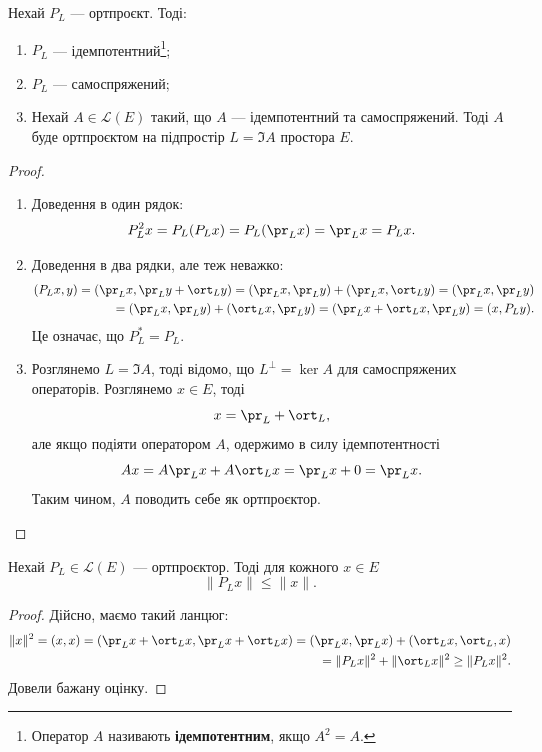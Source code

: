 \documentclass{math_library}
\begin{document}
\begin{proposition}
Нехай $P_L$ --- ортпроєкт. Тоді:
\begin{enumerate}[nosep,wide=0pt,label={\arabic*)}]
\item $P_L$ --- ідемпотентний\footnote{Оператор $A$ називають \textbf{ідемпотентним}, якщо $A^2 = A$.};
\item $P_L$ --- самоспряжений;
\item Нехай $A \in \mathcal{L}(E)$ такий, що $A$ --- ідемпотентний та самоспряжений. Тоді $A$ буде ортпроєктом на підпростір $L = \Im A$ простора $E$.
\end{enumerate}
\end{proposition}

\begin{proof}
\begin{enumerate}[topsep=0pt,wide=0pt,label={\arabic*)}]
\item Доведення в один рядок:
\[
P^2_L x = P_L (P_L x) = P_L (\pr_L x) = \pr_L x = P_L x.
\]

\item Доведення в два рядки, але теж неважко:
\begin{align*}
(P_L x, y) = (\pr_L x, \pr_L y + \ort_L y) = (\pr_L x,\pr_L y) + (\pr_L x,\ort_L y) = (\pr_L x,\pr_L y) \\ = (\pr_L x, \pr_L y) + (\ort_L x, \pr_L y) = (\pr_L x + \ort_L x, \pr_L y) = (x, P_L y).
\end{align*}
Це означає, що $P^*_L = P_L$.

\item Розглянемо $L = \Im A$, тоді відомо, що $L^\perp = \ker A$ для самоспряжених операторів. Розглянемо $x \in E$, тоді
\[
x = \pr_L + \ort_L,
\]
але якщо подіяти оператором $A$, одержимо в силу ідемпотентності
\[
Ax = A \pr_L x + A \ort_L x = \pr_L x + 0 = \pr_L x.
\]
Таким чином, $A$ поводить себе як ортпроєктор. \qedhere
\end{enumerate}

\end{proof}

\begin{proposition}
Нехай $P_L \in \mathcal{L}(E)$ --- ортпроєктор. Тоді для кожного $x \in E$ 
\[\|P_L x\| \leq \|x\|.
\]
\end{proposition}

\begin{proof}
Дійсно, маємо такий ланцюг:
\begin{align*}
\|x\|^2 = (x,x) = (\pr_L x + \ort_L x, \pr_L x + \ort_L x) = (\pr_L x, \pr_L x) + (\ort_L x, \ort_L, x) \\ = \|P_L x\|^2 + \|\ort_L x\|^2 \geq \|P_L x\|^2.
\end{align*}
Довели бажану оцінку.
\end{proof}
\end{document}
